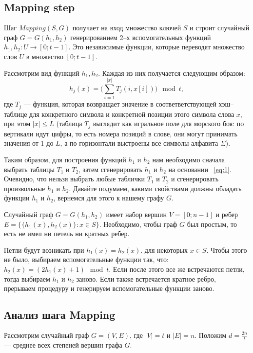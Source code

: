 \documentclass[specialist,
               substylefile = spbu.rtx,
               subf,href,colorlinks=true, 12pt]{disser}
\begin{document}
\subsection{Mapping step}

Шаг $Mapping (S, G)$ получает на вход множество ключей $S$ и строит случайный граф $G = G(h_1, h_2)$  генерированием 2--х вспомогательных функций $h_1, h_2 : U \longrightarrow [0;t - 1]$. Это независимые функции, которые переводят множество слов $U$ в множество $[0; t - 1]$.

Рассмотрим вид функций $h_1, h_2$. Каждая из них получается следующим образом:
%
\begin{equation}\label{eq:1}
h_j(x) = \Big ( \sum \limits_{i = 1}^{|x|}T_j(i,x[i])\Big)\mod t,
\end{equation}
%
где $T_j$ --- функция, которая возвращает значение в соответветствующей хэш--таблице для конкретного символа и конкретной позиции этого символа слова $x$, при этом $|x| \leq L$ (таблица $T_j$ выглядит как игральное поле для морского боя: по вертикали идут цифры, то есть номера позиций в слове, они могут принимать значения от 1 до $L$, а по горизонтали выстроены все символы алфавита $\Sigma$).

Таким образом, для построения функций $h_1$ и $h_2$ нам необходимо сначала выбрать таблицы $T_1$ и $T_2$, затем сгенерировать $h_1$ и $h_2$ на основании ~\ref{eq:1}. Очевидно, что нельзя выбрать любые таблички $T_1$ и $T_2$ и сгенерировать произвольные $h_1$ и $h_2$. Давайте подумаем, какими свойствами должны обладать функции $h_1$ и $h_2$, вернемся для этого к нашему графу $G$.

Случайный граф $G = G(h_1, h_2)$ имеет набор вершин $V = [0;n - 1]$ и ребер $E = \{\{h_1(x),h_2(x)\}: x \in S\}$. Необходимо, чтобы граф $G$ был простым, то есть не имел ни петель ни кратных ребер.

Петли будут возникать при $h_1(x) = h_2(x)$. для некоторых $x \in S$. Чтобы этого не было, выбираем вспомогательные функции так, что: $h_2(x) = (2h_1(x) + 1)\mod t$. Если после этого все же встречаются петли, тогда выбираем $h_1$ и $h_2$ заново. Если также встречается кратное ребро, прерываем процедуру и генерируем вспомогательные функции заново.

\subsection{Анализ шага Mapping} \label{sec:mapan}

Рассмотрим случайный граф $G = (V,E)$, где $|V| = t$ и $|E| = n$. Положим $d = \frac{2n}{t}$ --- среднее всех степеней вершин графа $G$.
\end{document}
